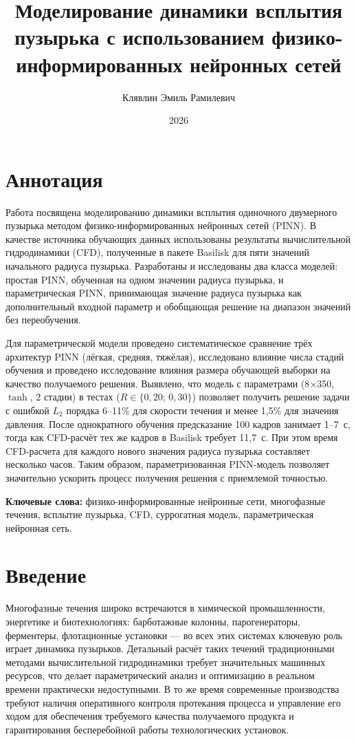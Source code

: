 \documentclass[12pt,a4paper]{article}
\title{Моделирование динамики всплытия пузырька с использованием физико-информированных нейронных сетей}
\author{Клявлин Эмиль Рамилевич}
\date{2026}
\begin{document}
\maketitle

\newpage
\tableofcontents
\newpage

\section*{Аннотация}

Работа посвящена моделированию динамики всплытия одиночного двумерного пузырька
методом физико-информированных нейронных сетей (PINN). В качестве источника
обучающих данных использованы результаты вычислительной гидродинамики (CFD),
полученные в пакете Basilisk для пяти значений начального радиуса пузырька.
Разработаны и исследованы два класса моделей: простая PINN, обученная на одном
значении радиуса пузырька, и параметрическая PINN, принимающая значение радиуса пузырька как дополнительный входной параметр и обобщающая решение на диапазон значений без переобучения.

Для параметрической модели проведено систематическое сравнение трёх архитектур PINN
(лёгкая, средняя, тяжёлая), исследовано влияние числа стадий обучения и проведено исследование влияния размера обучающей выборки на качество получаемого решения. Выявлено, что модель с параметрами (8$\times$350, $\tanh$, 2 стадии)
в тестах ($R\in\{0{,}20;\,0{,}30\}$) позволяет получить решение задачи с ошибкой $L_2$ порядка 6--11\% для скорости течения и менее 1{,}5\% для значения давления.
После однократного обучения предсказание 100 кадров занимает 1--7~с,
тогда как CFD-расчёт тех же кадров в Basilisk требует 11{,}7~с.
При этом время CFD-расчета для каждого нового значения радиуса пузырька составляет несколько часов. Таким образом, параметризованная PINN-модель позволяет значительно ускорить процесс получения решения с приемлемой точностью.

\bigskip
\noindent\textbf{Ключевые слова:} физико-информированные нейронные сети,
многофазные течения, всплытие пузырька, CFD, суррогатная модель,
параметрическая нейронная сеть.

\newpage

\section*{Введение}


Многофазные течения широко встречаются в химической промышленности, энергетике
и биотехнологиях: барботажные колонны, парогенераторы, ферментеры, флотационные
установки --- во всех этих системах ключевую роль играет динамика пузырьков.
Детальный расчёт таких течений традиционными методами вычислительной
гидродинамики требует значительных машинных ресурсов, что делает
параметрический анализ и оптимизацию в реальном времени практически недоступными. 
В то же время современные производства требуют наличия оперативного контроля протекания процесса 
и управление его ходом для обеспечения требуемого качества получаемого продукта и гарантирования бесперебойной работы технологических установок.
\end{document}
